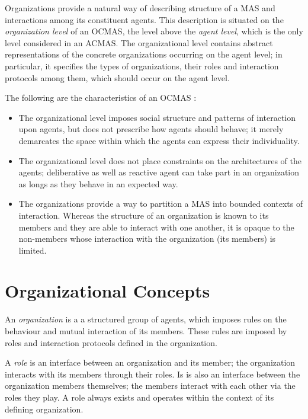 Organizations provide a natural way of describing structure of a MAS and interactions among its constituent agents.
This description is situated on the \textit{organization level} of an OCMAS, the level above the \textit{agent level}, which is the only level considered in an ACMAS.
The organizational level contains abstract representations of the concrete organizations occurring on the agent level; in particular, it specifies the types of organizations, their roles and interaction protocols among them, which should occur on the agent level.

The following are the characteristics of an OCMAS \cite{Ferber03}:
\begin{itemize}
	\item The organizational level imposes social structure and patterns of interaction upon agents, but does not prescribe how agents should behave; it merely demarcates the space within which the agents can express their individuality.
	\item The organizational level does not place constraints on the architectures of the agents; deliberative as well as reactive agent can take part in an organization as longs as they behave in an expected way.
	\item The organizations provide a way to partition a MAS into bounded contexts of interaction.
	Whereas the structure of an organization is known to its members and they are able to interact with one another, it is opaque to the non-members whose interaction with the organization (its members) is limited.
\end{itemize}

\section{Organizational Concepts}

An \textit{organization} is a a structured group of agents, which imposes rules on the behaviour and mutual interaction of its members. 
These rules are imposed by roles and interaction protocols defined in the organization.

A \textit{role} is an interface between an organization and its member; the organization interacts with its members through their roles.
Is is also an interface between the organization members themselves; the members interact with each other via the roles they play.
A role always exists and operates within the context of its defining organization.

